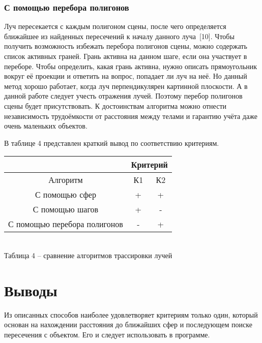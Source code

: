 {    \subsubsection{С помощью перебора полигонов} {
        Луч пересекается с каждым полигоном сцены, после чего определяется ближайшее
        из найденных пересечений к началу данного луча~[10].
        Чтобы получить возможность избежать перебора полигонов сцены, можно содержать
        список активных граней.
        Грань активна на данном шаге, если она участвует в переборе.
        Чтобы определить, какая грань активна, нужно описать прямоугольник вокруг
        её проекции и ответить на вопрос, попадает ли луч на неё.
        Но данный метод хорошо работает, когда луч перпендикулярен
        картинной плоскости.
        А в данной работе следует учесть отражения лучей.
        Поэтому перебор полигонов сцены будет присутствовать.
        К достоинствам алгоритма можно отнести независимость трудоёмкости от расстояния между телами и гарантию учёта даже очень маленьких объектов.
    }

    В таблице 4 представлен краткий вывод по соответствию критериям.
    
    \begin{center}
        \begin{tabular} { |c|c|c| }
            \hline
            \hspace{0pt} & \multicolumn{2}{|c|}{Критерий} \\
            \hline
            Алгоритм & К1 & К2 \\
            \hline
            С помощью сфер & + & + \\
            \hline
            С помощью шагов & + & - \\
            \hline
            С помощью перебора полигонов & - & + \\
            \hline
        \end{tabular}
        \\
    \vspace{2mm}
    \small { Таблица 4 -- сравнение алгоритмов трассировки лучей }
    \end{center}

    \section*{Выводы} {
        Из описанных способов наиболее удовлетворяет критериям только
        один, который основан на нахождении расстояния до ближайших сфер
        и последующем поиске пересечения с объектом.
        Его и следует использовать в программе.
    }
}